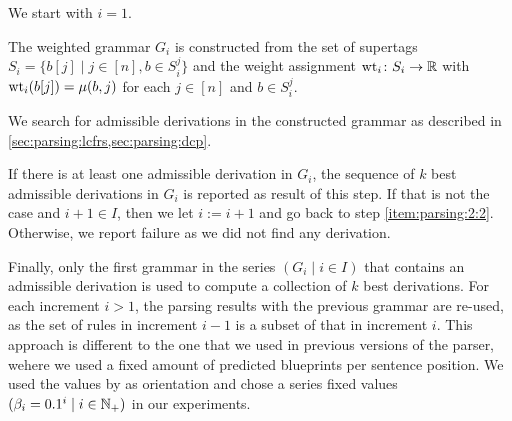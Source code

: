 \documentclass[../document.tex]{subfiles}
\begin{document}
    \begin{compactenum}
        \item We start with \(i = 1\).
        \item \label{item:parsing:2:2}
            The weighted grammar \(G_i\) is constructed from the set of supertags \(S_i = \{b[j] \mid j \in [n], b \in S_i^j \}\) and the weight assignment \(\operatorname{wt}_{i}\colon S_i \to \mathbb{R}\) with \(\operatorname{wt}_i(b[j]) = \mu(b, j)\) for each \(j \in [n]\) and \(b \in S_i^j\).
        \item We search for admissible derivations in the constructed grammar as described in \cref{sec:parsing:lcfrs,sec:parsing:dcp}.
        \item
            If there is at least one admissible derivation in \(G_i\), the sequence of \(k\) best admissible derivations in \(G_i\) is reported as result of this step.
            If that is not the case and \(i+1 \in I\), then we let \(i := i+1\) and go back to step \ref{item:parsing:2:2}.
            Otherwise, we report failure as we did not find any derivation.
    \end{compactenum}
    Finally, only the first grammar in the series \((G_i \mid i \in I)\) that contains an admissible derivation is used to compute a collection of \(k\) best derivations.
    For each increment \(i > 1\), the parsing results with the previous grammar are re-used, as the set of rules in increment \(i-1\) is a subset of that in increment \(i\).
    This approach is different to the one that we used in previous versions of the parser, wehere we used a fixed amount of predicted blueprints per sentence position. \citep{RupMoe21, Rup22}
    We used the values by \citet{Clark04} as orientation and chose a series fixed values \((\beta_i = 0.1^i \mid i \in \mathbb{N}_+)\) in our experiments.
\end{document}
